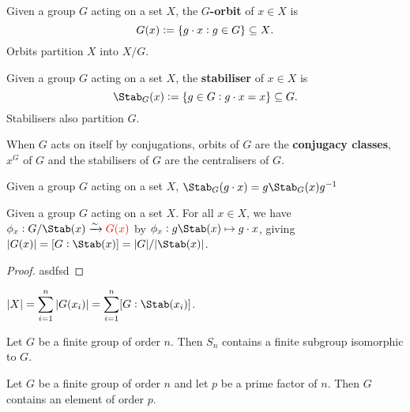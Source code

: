 \documentclass[../Year2.tex]{subfiles}
\begin{document}
\begin{definition}[Orbit]
    Given a group $G$ acting on a set $X$, the \textbf{$G$-orbit} of $x\in X$ is \[
        G(x):=\{g\cdot x:g\in G\} \subseteq X
    \text{\textcolor{black}{.}}
    \] Orbits partition $X$ into $X/G$.
\end{definition}

\begin{definition}[Stabiliser]
    Given a group $G$ acting on a set $X$, the \textbf{stabiliser} of $x\in X$ is \[
        \Stab_G(x):= \{g\in G: g\cdot x = x\} \subseteq G
        \black{.}
        \] Stabilisers also partition $G$.
    \end{definition}
    
\begin{remark}
    When $G$ acts on itself by conjugations, orbits of $G$ are the \textbf{conjugacy classes}, $x^G$ of $G$ and the stabilisers of $G$ are the centralisers of $G$.
\end{remark}

\begin{lemma}
    Given a group $G$ acting on a set $X$, $\Stab_G(g\cdot x)=g\Stab_G(x)g^{-1}$
\end{lemma}

\begin{theorem}
    Given a group $G$ acting on a set $X$. For all $x\in X$, we have $\phi_x:G/\Stab(x)\xrightarrow{\sim}\textcolor{red}{G(x)}$ by $\phi_x:g\Stab(x)\mapsto g\cdot x$, giving $|G(x)| = [G:\Stab(x)] = |G|/|\Stab(x)|$.
    \begin{proof}
        asdfsd
    \end{proof}
\end{theorem}

\vspace{-15pt}

\begin{corollary}
    $\displaystyle|X| = \sum_{i=1}^n|G(x_i)| = \sum_{i=1}^n[G:\Stab(x_i)]$. 
\end{corollary}

\begin{corollary}
    Let $G$ be a finite group of order $n$. Then $S_n$ contains a finite subgroup isomorphic to $G$.
\end{corollary}

\begin{corollary}
    Let $G$ be a finite group of order $n$ and let $p$ be a prime factor of $n$. Then $G$ contains an element of order $p$.
\end{corollary}
\end{document}
